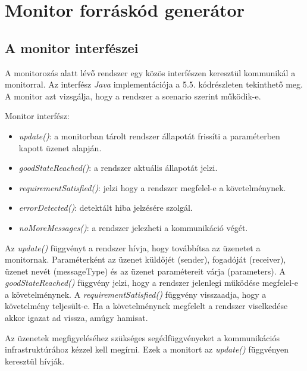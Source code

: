 \section{Monitor forráskód generátor}

\subsection{A monitor interfészei}

A monitorozás alatt lévő rendszer egy közös interfészen keresztül kommunikál a monitorral.
Az interfész \textit{Java} implementációja a 5.5. kódrészleten tekinthető meg.
A monitor azt vizsgálja, hogy a rendszer a scenario szerint működik-e.

Monitor interfész:
\begin{itemize}
    \item \textit{update()}: a monitorban tárolt rendszer állapotát frissíti a paraméterben kapott üzenet alapján.
    \item \textit{goodStateReached()}: a rendszer aktuális állapotát jelzi.
    \item \textit{requirementSatisfied()}: jelzi hogy a rendszer megfelel-e a követelménynek.
    \item \textit{errorDetected()}: detektált hiba jelzésére szolgál.
    \item \textit{noMoreMessages()}: a rendszer jelezheti a kommunikáció végét.
\end{itemize}

Az \textit{update()} függvényt a rendszer hívja, hogy továbbítsa az üzenetet a monitornak.
Paraméterként az üzenet küldőjét (sender), fogadóját (receiver), üzenet nevét (messageType) és az üzenet paramétereit várja (parameters).
A \textit{goodStateReached()} függvény jelzi, hogy a rendszer jelenlegi működése megfelel-e a követelménynek.
A \textit{requirementSatisfied()} függvény visszaadja, hogy a követelmény teljesült-e.
Ha a követelménynek megfelelt a rendszer viselkedése akkor igazat ad vissza, amúgy hamisat.

Az üzenetek megfigyeléséhez szükséges segédfüggvényeket a kommunikációs infrastruktúrához kézzel kell megírni.
Ezek a monitort az \textit{update()} függvényen keresztül hívják.

